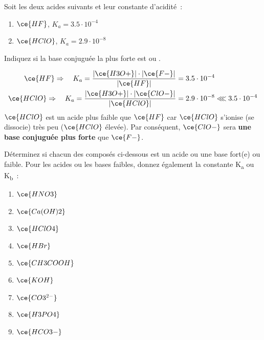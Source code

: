 \documentclass[
  11pt,
  a4paper,
  openany]{book}
\providecommand{\tightlist}{%
  \setlength{\itemsep}{0pt}\setlength{\parskip}{0pt}}
\begin{document}
\begin{Exercise}
Soit les deux acides suivants et leur constante d'acidité~:

\begin{enumerate}
\def\labelenumi{\alph{enumi}.}
\tightlist
\item
  \(\ce{HF}\), \(K_a = 3.5 \cdot 10^{-4}\)
\item
  \(\ce{HClO}\), \(K_a = 2.9 \cdot 10^{-8}\)
\end{enumerate}

Indiquez si la base conjuguée la plus forte est  ou .

\end{Exercise}

\begin{Answer}
\[
\begin{split}
  \ce{HF} \Rightarrow \quad K_a = \frac{|\ce{H3O+}| \cdot |\ce{F-}|}{|\ce{HF}|} &= 3.5 \cdot 10^{-4} \\
  \ce{HClO} \Rightarrow \quad K_a = \frac{|\ce{H3O+}| \cdot |\ce{ClO-}|}{|\ce{HClO}|} &= 2.9 \cdot 10^{-8} \lll 3.5 \cdot 10^{-4}
\end{split}
\]
\(\ce{HClO}\) est un acide plus faible que \(\ce{HF}\) car \(\ce{HClO}\) s'ionise (se dissocie) très peu (\textbar{}\(\ce{HClO}\)\textbar{} élevée). Par conséquent, \(\ce{ClO-}\) sera \textbf{une base conjuguée plus forte} que \(\ce{F-}\).

\end{Answer}

\clearpage

\begin{Exercise}

Déterminez si chacun des composés ci-dessous est un acide ou une base fort(e) ou faible. Pour les acides ou les bases faibles, donnez également la constante K\textsubscript{a} ou K\textsubscript{b}~:

\begin{enumerate}
\def\labelenumi{\alph{enumi}.}
\tightlist
\item
  \(\ce{HNO3}\)
\item
  \(\ce{Ca(OH)2}\)
\item
  \(\ce{HClO4}\)
\item
  \(\ce{HBr}\)
\item
  \(\ce{CH3COOH}\)
\item
  \(\ce{KOH}\)
\item
  \(\ce{CO3^{2-}}\)
\item
  \(\ce{H3PO4}\)
\item
  \(\ce{HCO3-}\)
\end{enumerate}

\end{Exercise}
\end{document}
